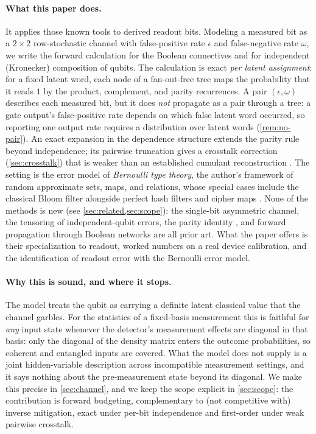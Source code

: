 \documentclass[11pt]{article}
\numberwithin{equation}{section}
\theoremstyle{plain}
\theoremstyle{definition}
\theoremstyle{remark}
\newcommand{\eps}{\epsilon}
\begin{document}
\paragraph{What this paper does.} It applies those known tools to derived
readout bits. Modeling a measured bit as a $2\times2$ row-stochastic channel
with false-positive rate $\eps$ and false-negative rate $\omega$, we write the
forward calculation for the Boolean connectives and for independent
(Kronecker) composition of qubits. The calculation is exact \emph{per latent
assignment}: for a fixed latent word, each node of a fan-out-free tree maps
the probability that it reads $1$ by the product, complement, and parity
recurrences. A pair $(\eps,\omega)$ describes each measured bit, but it does
\emph{not} propagate as a pair through a tree: a gate output's false-positive
rate depends on which false latent word occurred, so reporting one output rate
requires a distribution over latent words (\cref{rem:no-pair}). An exact
expansion in the dependence structure extends the parity rule beyond
independence; its pairwise truncation gives a crosstalk correction
(\cref{sec:crosstalk}) that is weaker than an established cumulant
reconstruction \citep{hamilton2020scalable}. The setting is the error model of
\emph{Bernoulli type theory}, the author's framework of random approximate
sets, maps, and relations, whose special cases include the classical Bloom
filter \citep{bloom1970} alongside perfect hash filters and cipher maps
\citep{bernoulliSets,bernoulliComposition,bernoulliMaps}. None of the methods
is new (see \cref{sec:related,sec:scope}): the single-bit asymmetric channel,
the tensoring of independent-qubit errors, the parity identity
\citep{gallager1962ldpc,matsui1993linear}, and forward propagation through
Boolean networks \citep{parker1975probabilistic,krishnaswamy2008ptm} are all
prior art. What the paper offers is their specialization to readout, worked
numbers on a real device calibration, and the identification of readout error
with the Bernoulli error model.

\paragraph{Why this is sound, and where it stops.} The model treats the qubit
as carrying a definite latent classical value that the channel garbles. For
the statistics of a fixed-basis measurement this is faithful for \emph{any}
input state whenever the detector's measurement effects are diagonal in that
basis: only the diagonal of the density matrix enters the outcome
probabilities, so coherent and entangled inputs are covered. What the model
does not supply is a joint hidden-variable description across incompatible
measurement settings, and it says nothing about the pre-measurement state
beyond its diagonal. We make this precise in \cref{sec:channel}, and we keep
the scope explicit in \cref{sec:scope}: the contribution is forward budgeting,
complementary to (not competitive with) inverse mitigation, exact under per-bit
independence and first-order under weak pairwise crosstalk.
\end{document}
